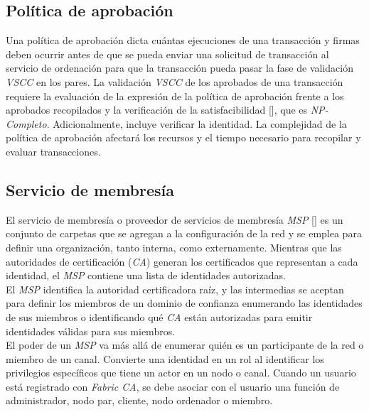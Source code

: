 \subsection{Pol\'itica de aprobaci\'on}
Una pol\'itica de aprobaci\'on dicta cu\'antas ejecuciones de una transacci\'on y firmas deben ocurrir antes de que se pueda enviar una solicitud de transacci\'on al servicio de ordenaci\'on para que la transacci\'on pueda pasar la fase de validaci\'on \emph{VSCC} en los pares. La validaci\'on \emph{VSCC} de los aprobados de una transacci\'on requiere la evaluaci\'on de la expresi\'on de la pol\'itica de aprobaci\'on frente a los aprobados recopilados y la verificaci\'on de la satisfacibilidad [\cite{gottlieb2002evolutionary}], que es \emph{NP-Completo}. Adicionalmente, incluye verificar la identidad. La complejidad de la pol\'itica de aprobaci\'on afectar\'a los recursos y el tiempo necesario para recopilar y evaluar transacciones.

\subsection{Servicio de membres\'ia}
El servicio de membres\'ia o proveedor de servicios de membres\'ia \emph{MSP} [\cite{MSP}] es un conjunto de carpetas que se agregan a la configuraci\'on de la red y se emplea para definir una organizaci\'on, tanto interna, como externamente. Mientras que las autoridades de certificaci\'on (\emph{CA}) generan los certificados que representan a cada identidad, el \emph{MSP} contiene una lista de identidades autorizadas.\\

El \emph{MSP} identifica la autoridad certificadora ra\'iz, y las intermedias se aceptan para definir los miembros de un dominio de confianza enumerando las identidades de sus miembros o identificando qu\'e \emph{CA} est\'an autorizadas para emitir identidades v\'alidas para sus miembros.\\

El poder de un \emph{MSP} va m\'as all\'a de enumerar qui\'en es un participante de la red o miembro de un canal. Convierte una identidad en un rol al identificar los privilegios espec\'ificos que tiene un actor en un nodo o canal. Cuando un usuario est\'a registrado con \emph{Fabric CA}, se debe asociar con el usuario una funci\'on de administrador, nodo par, cliente, nodo ordenador o miembro.\\ 


